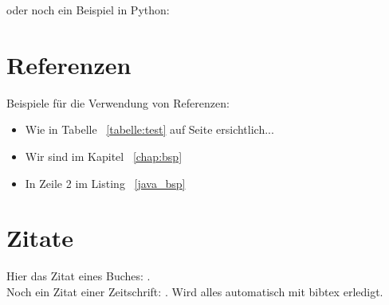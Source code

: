 oder noch ein Beispiel in Python:


\section{Referenzen}

Beispiele für die Verwendung von Referenzen: 

\begin{itemize}
	\item Wie in Tabelle ~\ref{tabelle:test} auf Seite \pageref{tabelle:test} ersichtlich... 
	\item Wir sind im Kapitel ~\ref{chap:bsp}
	\item In Zeile 2 im Listing ~\ref{java_bsp} 
\end{itemize}


\section{Zitate}


Hier das Zitat eines Buches: \cite{couper2001}. \\
Noch ein Zitat einer Zeitschrift: \cite{reips2002}. Wird alles automatisch mit bibtex erledigt. 
